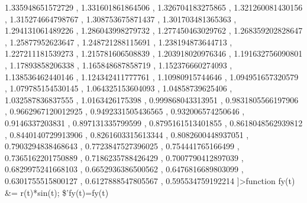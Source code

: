 \documentclass[
]{book}
\begin{document}
1.335948651572729 , 1.331601861864506 , 1.326704183275865 , 1.321260081430156 , 1.315274664798767 , 1.308753675871437 , 1.301703481365363 , 1.294131061489226 , 1.286043998279732 , 1.277450463029762 , 1.268359202828647 , 1.25877952623647 , 1.248721288115691 , 1.238194873644713 , 1.227211181539273 , 1.215781606508839 , 1.203918020976346 , 1.191632756090801 , 1.17893858206338 , 1.165848687858719 , 1.152376660274093 , 1.138536462440146 , 1.124342411777761 , 1.10980915744646 , 1.094951657320579 , 1.079785154530145 , 1.064325153604093 , 1.04858739625406 , 1.032587836837555 , 1.0163426175398 , 0.999868043313951 , 0.9831805566197906 , 0.9662967120012925 , 0.9492331505436565 , 0.932006574250646 , 0.9146337203831 , 0.897131335799599 , 0.8795161513401855 , 0.8618048562939812 , 0.8440140729913906 , 0.8261603315613344 , 0.8082600448937051 , 0.7903294838468643 , 0.7723847527396025 , 0.754441765166499 , 0.7365162201750889 , 0.7186235788426429 , 0.7007790412897039 , 0.6829975241668103 , 0.6652936386500562 , 0.6476816689803099 , 0.6301755515800127 , 0.6127888547805567 , 0.595534759192214 \right]\]\textgreater function fy(t) \&= r(t)*sin(t); \$'fy(t)=fy(t)
\end{document}
